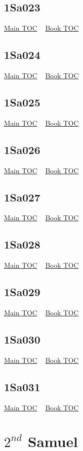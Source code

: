 \documentclass{book}
\begin{document}
  \section{1Sa023}\hyperlink{toc}{Main TOC} ~ \hyperref[subsec:1Sa]{Book TOC} 
  \section{1Sa024}\hyperlink{toc}{Main TOC} ~ \hyperref[subsec:1Sa]{Book TOC} 
  \section{1Sa025}\hyperlink{toc}{Main TOC} ~ \hyperref[subsec:1Sa]{Book TOC} 
  \section{1Sa026}\hyperlink{toc}{Main TOC} ~ \hyperref[subsec:1Sa]{Book TOC} 
  \section{1Sa027}\hyperlink{toc}{Main TOC} ~ \hyperref[subsec:1Sa]{Book TOC} 
  \section{1Sa028}\hyperlink{toc}{Main TOC} ~ \hyperref[subsec:1Sa]{Book TOC} 
  \section{1Sa029}\hyperlink{toc}{Main TOC} ~ \hyperref[subsec:1Sa]{Book TOC} 
  \section{1Sa030}\hyperlink{toc}{Main TOC} ~ \hyperref[subsec:1Sa]{Book TOC} 
  \section{1Sa031}\hyperlink{toc}{Main TOC} ~ \hyperref[subsec:1Sa]{Book TOC} 
  \chapter{$2^{nd}$ Samuel} \label{subsec:2Sa} \begin{multicols}{2} \minitoc \end{multicols}
\end{document}
